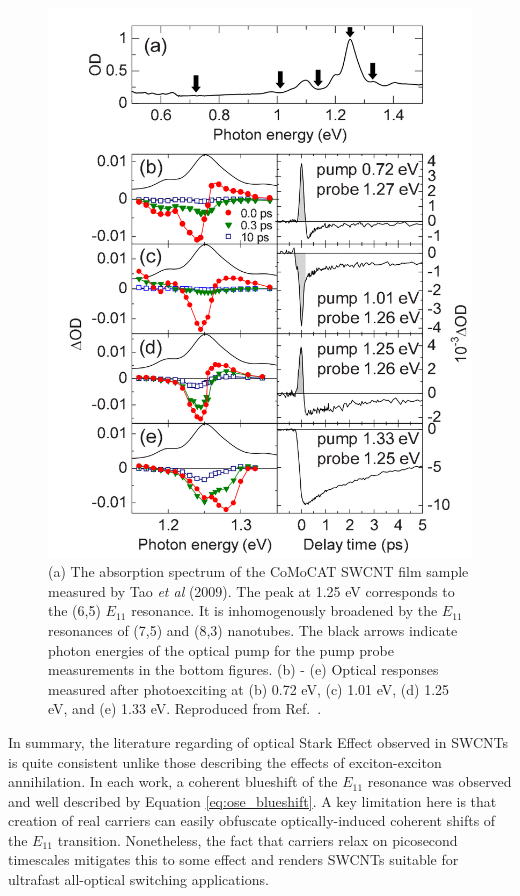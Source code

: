 \begin{figure}[ht]
	\centering
	\includegraphics[scale=0.25]{images/chapter_prior_works/abs_dtt_tao_2009}
	\caption{(a) The absorption spectrum of the CoMoCAT SWCNT film sample measured by Tao \textit{et al} (2009). The peak at 1.25 eV corresponds to the (6,5) $E_{11}$ resonance. It is inhomogenously broadened by the $E_{11}$ resonances of (7,5) and (8,3) nanotubes. The black arrows indicate photon energies of the optical pump for the pump probe measurements in the bottom figures. (b) - (e) Optical responses measured after photoexciting at (b) 0.72 eV, (c) 1.01 eV, (d) 1.25 eV, and (e) 1.33 eV.  Reproduced from Ref.\ \cite{tao2009subpicosecond}.}
	\label{fig:abs_dtt_tao_2009}
\end{figure}

In summary, the literature regarding of optical Stark Effect observed in SWCNTs is quite consistent unlike those describing the effects of exciton-exciton annihilation. In each work, a coherent blueshift of the $E_{11}$ resonance was observed and well described by Equation \eqref{eq:ose_blueshift}. A key limitation here is that creation of real carriers can easily obfuscate optically-induced coherent shifts of the $E_{11}$ transition. Nonetheless, the fact that carriers relax on picosecond timescales mitigates this to some effect and renders SWCNTs suitable for ultrafast all-optical switching applications.


